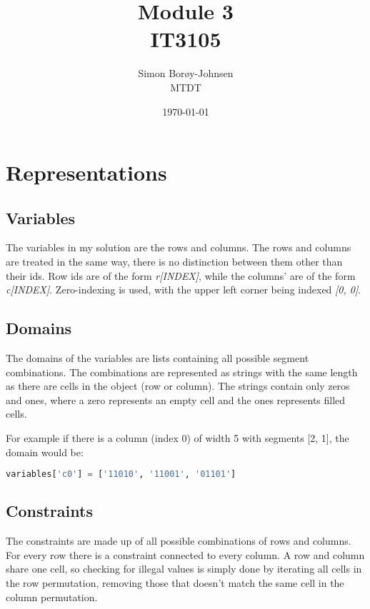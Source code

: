 \documentclass{article}
\begin{document}
\title{\textbf{Module 3} \\ IT3105}
\author{Simon Borøy-Johnsen \\ MTDT}
\date{\today}
\maketitle


\section*{Representations}
\subsection*{Variables}
The variables in my solution are the rows and columns. The rows and columns are treated in the same way, there is no distinction between them other than their ids. Row ids are of the form \textit{r[INDEX]}, while the columns' are of the form \textit{c[INDEX]}. Zero-indexing is used, with the upper left corner being indexed \textit{[0, 0]}.

\subsection*{Domains}
The domains of the variables are lists containing all possible segment combinations. The combinations are represented as strings with the same length as there are cells in the object (row or column). The strings contain only zeros and ones, where a zero represents an empty cell and the ones represents filled cells.

For example if there is a column (index 0) of width 5 with segments [2, 1], the domain would be:
\begin{lstlisting}[language=Python]
variables['c0'] = ['11010', '11001', '01101']
\end{lstlisting}

\subsection*{Constraints}
The constraints are made up of all possible combinations of rows and columns. For every row there is a constraint connected to every column. A row and column share one cell, so checking for illegal values is simply done by iterating all cells in the row permutation, removing those that doesn't match the same cell in the column permutation.
\end{document}
